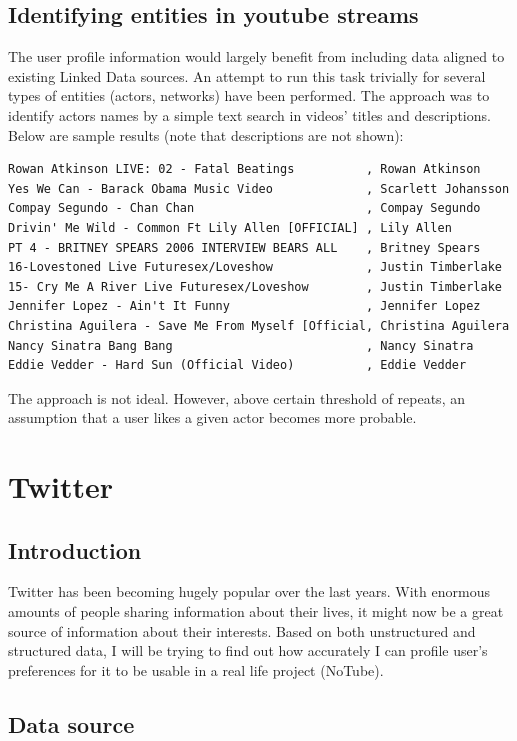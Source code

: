 \documentclass{article}
\begin{document}
\subsection{Identifying entities in youtube streams}
The user profile information would largely benefit from including data aligned
to existing Linked Data sources. An attempt to run this task trivially for
several types of entities (actors, networks) have been performed. The approach
was to identify actors names by a simple text search in videos' titles and
descriptions. Below are sample results (note that descriptions are not shown):

\begin{verbatim}
Rowan Atkinson LIVE: 02 - Fatal Beatings          , Rowan Atkinson
Yes We Can - Barack Obama Music Video             , Scarlett Johansson
Compay Segundo - Chan Chan                        , Compay Segundo
Drivin' Me Wild - Common Ft Lily Allen [OFFICIAL] , Lily Allen
PT 4 - BRITNEY SPEARS 2006 INTERVIEW BEARS ALL    , Britney Spears
16-Lovestoned Live Futuresex/Loveshow             , Justin Timberlake
15- Cry Me A River Live Futuresex/Loveshow        , Justin Timberlake
Jennifer Lopez - Ain't It Funny                   , Jennifer Lopez
Christina Aguilera - Save Me From Myself [Official, Christina Aguilera
Nancy Sinatra Bang Bang                           , Nancy Sinatra
Eddie Vedder - Hard Sun (Official Video)          , Eddie Vedder
\end{verbatim}

The approach is not ideal. However, above certain threshold of repeats, an
assumption that a user likes a given actor becomes more probable.


\newpage
\section{Twitter}

\subsection{Introduction}
Twitter has been becoming hugely popular over the last years. With enormous amounts of people sharing information about their lives, it might now be a great source of information about their interests. Based on both unstructured and structured data, I will be trying to find out how accurately I can profile user's preferences for it to be usable in a real life project (NoTube).

\subsection{Data source}
\end{document}
